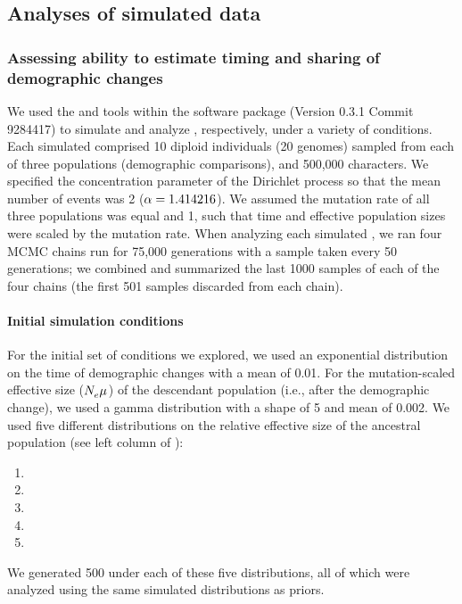 

\subsection{Analyses of simulated data}

\subsubsection{Assessing ability to estimate timing and sharing of demographic changes}

We used the \simcoevolity and \ecoevolity tools within the \ecoevolity software
package (Version 0.3.1 Commit 9284417) to simulate and analyze \datasets,
respectively, under a variety of conditions.
Each simulated \dataset comprised 10 diploid individuals (20 genomes) sampled
from each of three populations (demographic comparisons), and 500,000
characters.
We specified the concentration parameter of the Dirichlet process so that
the mean number of events was 2 ($\alpha = 1.414216$).
We assumed the mutation rate of all three populations was equal and 1, such
that time and effective population sizes were scaled by the mutation rate.
When analyzing each simulated \dataset, we ran four MCMC chains run for 75,000
generations with a sample taken every 50 generations; we combined and
summarized the last 1000 samples of each of the four chains (the first 501
samples discarded from each chain).

\paragraph{Initial simulation conditions}

For the initial set of conditions we explored, we used an exponential
distribution on the time of demographic changes with a mean of 0.01.
For the mutation-scaled effective size ($N_{e}^{}\mu_{}$) of the descendant
population (i.e., after the demographic change), we used a gamma distribution
with a shape of 5 and mean of 0.002.
We used five different distributions on the relative effective
size of the ancestral population (see left column of
\figs
{}):
\begin{enumerate}[label=A.\arabic*]
    \item {} 
    \item {} 
    \item {} 
    \item {} 
    \item {} 
\end{enumerate}
We generated 500 \datasets under each of these five distributions, all of which
were analyzed using the same simulated distributions as priors.

